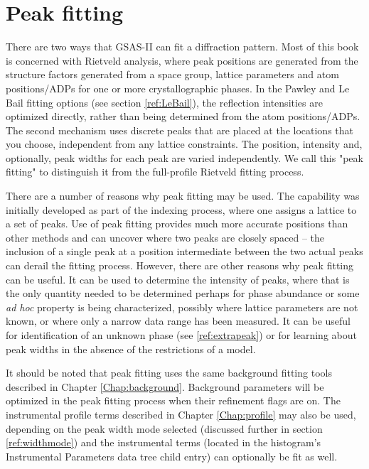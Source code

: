 \chapter{Peak fitting}\label{Chap:peakfitting}

There are two ways that GSAS-II can fit a diffraction pattern. Most of this book is concerned with Rietveld analysis, where peak positions are generated from the structure factors generated from a space group, lattice parameters and atom positions/ADPs for one or more crystallographic phases. In the Pawley and Le Bail fitting options (see section \ref{ref:LeBail}), the reflection intensities are optimized directly, rather than being determined from the atom positions/ADPs. The second mechanism uses discrete peaks that are placed at the locations that you choose, independent from any lattice constraints. The position, intensity and, optionally, peak widths for each peak are varied independently. We call this "peak fitting" to distinguish it from the full-profile Rietveld fitting process. 

There are a number of reasons why peak fitting may be used. The capability was initially developed as part of the indexing process, where one assigns a lattice to a set of peaks. Use of peak fitting provides much more accurate positions than other methods and can uncover where two peaks are closely spaced -- the inclusion of a single peak at a position intermediate between the two actual peaks can derail the fitting process. However, there are other reasons why peak fitting can be useful. It can be used to determine the intensity of peaks, where that is the only quantity needed to be determined perhaps for phase abundance or some \textit{ad hoc} property is being characterized, possibly where lattice parameters are not known, or where only a narrow data range has been measured. It can be useful for identification of an unknown phase (see \ref{ref:extrapeak}) or for learning about peak widths in the absence of the restrictions of a model. 

It should be noted that peak fitting uses the same background fitting tools described in Chapter \ref{Chap:background}. Background parameters will be optimized in the peak fitting process when their refinement flags are on. The instrumental profile terms described in Chapter \ref{Chap:profile} may also be used, depending on the peak width mode selected (discussed further in section \ref{ref:widthmode}) and the instrumental terms (located in the histogram's Instrumental Parameters data tree child entry) can optionally be fit as well. 

